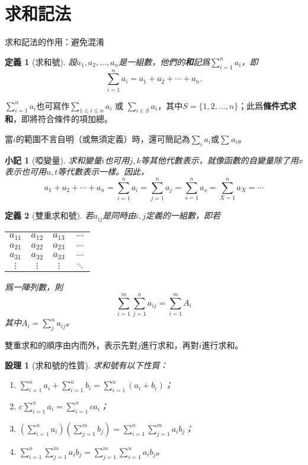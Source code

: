 \documentclass[12pt]{article}
\newtheorem{definition}{定義}
\newtheorem*{proposition}{設理}
\newtheorem*{remark}{小記}
\begin{document}
    \section*{求和記法}

    求和記法的作用：避免混淆

    \begin{definition}[求和號]
        設$a_1,a_2,\dots,a_n$是一組數，他們的\textbf{和}記爲$\displaystyle \sum_{i=1}^{n}a_i$，即$$\sum_{i=1}^{n}a_i=a_1+a_2+\cdots+a_n.$$
    \end{definition}

    $\displaystyle \sum_{i=1}^{n}a_i$也可寫作$\displaystyle \sum_{1\leq i\leq n} a_i$ 或 $\displaystyle\sum_{i\in S}a_i$，其中$S=\{1,2,\dots,n\}$；此爲\textbf{條件式求和}，即將符合條件的項加總。

    當$i$的範圍不言自明（或無須定義）時，還可簡記為$\displaystyle\sum_{i}a_i$或$\sum_{} a_i$。

    \begin{remark}[啞變量]
        求和變量$i$也可用$j,k$等其他代數表示，就像函數的自變量除了用$x$表示也可用$u,t$等代數表示一樣。因此，$$a_1+a_2+\cdots+a_n=\sum_{i=1}^{n}a_i=\sum_{j=1}^{n}a_j=\sum_{s=1}^{n}a_s=\sum_{X=1}^{n}a_X=\cdots$$
    \end{remark}

    \begin{definition}[雙重求和號]
        若$a_{ij}$是同時由$i,j$定義的一組數，即若
        \begin{center}
            \begin{tabular}{c c c c}
                $a_{11}$&$a_{12}$&$a_{13}$&$\cdots$\\
                $a_{21}$&$a_{22}$&$a_{23}$&$\cdots$\\
                $a_{31}$&$a_{32}$&$a_{33}$&$\cdots$\\
                $\vdots$&$\vdots$&$\vdots$&$\ddots$
            \end{tabular}
        \end{center}
        爲一陣列數，則$$\sum_{i=1}^{m}\sum_{j=1}^{n}a_{ij}=\sum_{i=1}^{m}A_i$$其中$\displaystyle A_i=\sum_{j}^{n}a_{ij}$。
    \end{definition}

    雙重求和的順序由内而外，表示先對$j$進行求和，再對$i$進行求和。

    \begin{proposition}[求和號的性質]
        求和號有以下性質：\begin{enumerate}
            \item $\displaystyle\sum_{i=1}^{n}a_i+\sum_{i=1}^{n}b_i=\sum_{i=1}^{n}(a_i+b_i)$；
            \item $\displaystyle c\sum_{i=1}^{n}a_i=\sum_{i=1}^{n}ca_i$；
            \item $\displaystyle (\sum_{i=1}^{n}a_i)(\sum_{j=1}^{m}b_j)=\sum_{i=1}^{n}\sum_{j=1}^{m}a_ib_j$；
            \item $\displaystyle \sum_{i=1}^{n}\sum_{j=1}^{m}a_ib_j=\sum_{j=1}^{m}\sum_{i=1}^{n}a_ib_j$。
        \end{enumerate}
    \end{proposition}
\end{document}

